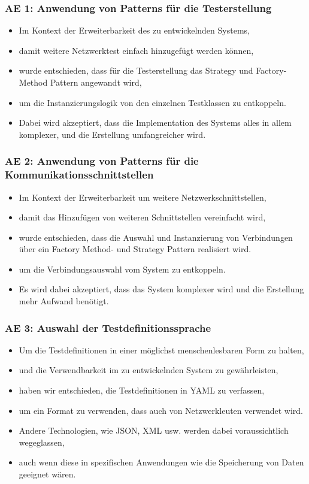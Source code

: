 \documentclass[
	ngerman,
	toc=listof, %
	toc=bibliography, %
	footnotes=multiple, %
	parskip=half, %
	numbers=noendperiod %
]{scrartcl}
\begin{document}
		\subsubsection{AE 1: Anwendung von Patterns für die Testerstellung}
		\begin{itemize}
			\item Im Kontext der Erweiterbarkeit des zu entwickelnden Systems,
			\item damit weitere Netzwerktest einfach hinzugefügt werden können,
			\item wurde entschieden, dass für die Testerstellung das Strategy und Factory-Method Pattern angewandt wird,
			\item um die Instanzierungslogik von den einzelnen Testklassen zu entkoppeln.
			\item Dabei wird akzeptiert, dass die Implementation des Systems alles in allem komplexer, und die Erstellung umfangreicher wird.			
		\end{itemize}

		\subsubsection{AE 2: Anwendung von Patterns für die Kommunikationsschnittstellen}
		\begin{itemize}
			\item Im Kontext der Erweiterbarkeit um weitere Netzwerkschnittstellen,
			\item damit das Hinzufügen von weiteren Schnittstellen vereinfacht wird,
			\item wurde entschieden, dass die Auswahl und Instanzierung von Verbindungen über ein Factory Method- und Strategy Pattern realisiert wird.
			\item um die Verbindungsauswahl vom System zu entkoppeln.
			\item Es wird dabei akzeptiert, dass das System komplexer wird und die Erstellung mehr Aufwand benötigt.
		\end{itemize}

		\subsubsection{AE 3: Auswahl der Testdefinitionssprache}
		\begin{itemize}
			\item Um die Testdefinitionen in einer möglichst menschenlesbaren Form zu halten,
			\item und die Verwendbarkeit im zu entwickelnden System zu gewährleisten,
			\item haben wir entschieden, die Testdefinitionen in YAML zu verfassen,
			\item um ein Format zu verwenden, dass auch von Netzwerkleuten verwendet wird.
			\item Andere Technologien, wie JSON, XML usw. werden dabei voraussichtlich wegeglassen,
			\item auch wenn diese in spezifischen Anwendungen wie die Speicherung von Daten geeignet wären.
		\end{itemize}
		\newpage
\end{document}
